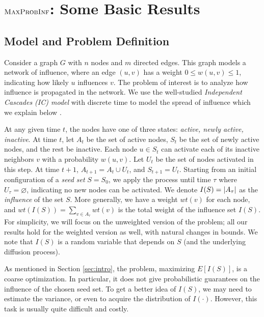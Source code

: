 \vspace{-0.1in}
\section{$\textsc{MaxProbInf}{}$: Some Basic Results}
\vspace{-0.05in}
\subsection{Model and Problem Definition}
\vspace{-0.05in}
\label{sec:model}
Consider a graph $G$ with $n$ nodes and $m$ directed edges. This graph models a network of
influence, where an edge $(u,v)$ has a weight $0 \leq w(u,v) \leq 1$, indicating how likely $u$
influences $v$. The problem of interest is to analyze how influence is propagated in the network.
We use the well-studied {\em Independent Cascades (IC) model} with discrete time to model the spread of influence which we explain below
\cite{kkt-2003}.

At any given time $t$, the nodes have one of three states: \textit{active, newly active, inactive}.
At time $t$, let $A_t$ be the set of active nodes, $S_t$ be the set of newly active nodes, and the rest
be inactive. Each node $u \in S_t$ can activate each of its inactive neighbors $v$ with a
probability $w(u,v)$. Let $U_t$ be the set of  nodes activated in this step. At time
$t+1$, $A_{t+1} = A_t \cup U_t$, and $S_{t+1} = U_t$. Starting from an initial configuration
of a {\em seed set} $S = S_0$, we apply the process until time $\tau$ where $U_{\tau} = \varnothing$,
indicating no new nodes can be activated. We denote $I(S) = \lvert A_{\tau}\rvert$ as the \textit{influence} of the set $S$.
More generally, we have a weight $wt(v)$ for each node, and $wt(I(S)) = \sum_{v\in A_{\tau}} wt(v)$ is the total weight
of the influence set $I(S)$. For simplicity, we will focus on the unweighted version of the problem; all our results hold for the weighted version as well, with natural changes in bounds. We note that $I(S)$ is a random variable that depends on $S$ (and the underlying
diffusion process).

As mentioned in Section \ref{sec:intro}, the \infmax{} problem, maximizing $E[I(S)]$, is a coarse
optimization. In particular, it does not give  probabilistic guarantees on the influence
of the chosen seed set. To get a better idea of $I(S)$, we may need to
estimate the variance, or even to acquire the distribution
of $I(\cdot)$.  However, this task is usually quite difficult and costly.

